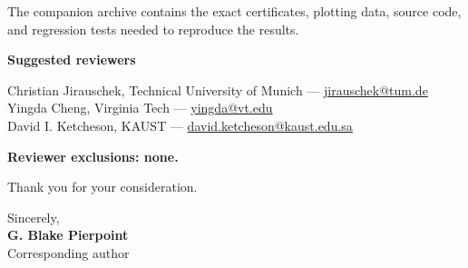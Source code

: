 \documentclass[10pt]{article}
\begin{document}
The companion archive contains the exact certificates, plotting data, source code, and regression tests needed to reproduce the results.

\textbf{Suggested reviewers}

Christian Jirauschek, Technical University of Munich --- \href{mailto:jirauschek@tum.de}{jirauschek@tum.de}\\
Yingda Cheng, Virginia Tech --- \href{mailto:yingda@vt.edu}{yingda@vt.edu}\\
David I. Ketcheson, KAUST --- \href{mailto:david.ketcheson@kaust.edu.sa}{david.ketcheson@kaust.edu.sa}

\textbf{Reviewer exclusions: none.}

Thank you for your consideration.

Sincerely,\\[1.20em]
{\bfseries G. Blake Pierpoint}\\
Corresponding author
\end{document}
